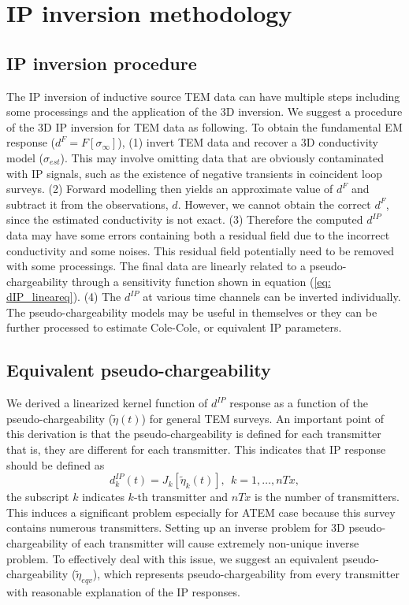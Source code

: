 \documentclass[a4paper, 11pt]{article}
\newcommand{\siginf}{\sigma_\infty}
\newcommand{\peta}{\tilde{\eta}}
\newcommand{\dip}{d^{IP}}
\begin{document}
\section{IP inversion methodology}

\subsection{IP inversion procedure}
The IP inversion of inductive source TEM data can have multiple steps including some processings and the application of the 3D inversion. We suggest a procedure of the 3D IP inversion for TEM data as following.
To obtain the fundamental EM response ($d^F = F[\siginf]$), (1) invert TEM data and recover a 3D conductivity model ($\sigma_{est}$). 
This may involve omitting data that are obviously contaminated with IP signals, such as the existence of negative transients in coincident loop surveys. 
(2) Forward modelling then yields an approximate value of $d^F$ and subtract it from the observations, $d$. 
However, we cannot obtain the correct $d^F$, since the estimated conductivity is not exact. 
(3) Therefore the computed $\dip$ data may have some errors containing both a residual field due to the incorrect conductivity and some noises. This residual field potentially need to be removed with some processings. 
The final data are linearly related to a pseudo-chargeability through a sensitivity function shown in equation (\ref{eq: dIP_lineareq}). 
(4) The $\dip$ at various time channels can be inverted individually. The pseudo-chargeability models may be useful in themselves or they can be further processed to estimate Cole-Cole, or equivalent IP parameters.

\subsection{Equivalent pseudo-chargeability}
We derived a linearized kernel function of $\dip$ response as a function of the pseudo-chargeability ($\peta(t)$) for general TEM surveys. 
An important point of this derivation is that the pseudo-chargeability is defined for each transmitter that is, they are different for each transmitter. 
This indicates that IP response should be defined as 
\begin{equation}
  \dip_k(t) = J_k[\peta_k (t)], \ \ k=1, \ldots, nTx,
\end{equation}
the subscript $k$ indicates $k$-th transmitter and $nTx$ is the number of transmitters. This induces a significant problem especially for ATEM case because this survey contains numerous transmitters.
Setting up an inverse problem for 3D pseudo-chargeability of each transmitter will cause extremely non-unique inverse problem. 
To effectively deal with this issue, we suggest an equivalent pseudo-chargeability ($\peta_{eqv}$), which represents pseudo-chargeability from every transmitter with reasonable explanation of the IP responses. 
\end{document}

